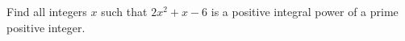 Find all integers $x$ such that $2x^2+x-6$ is a positive integral power of a prime positive integer.